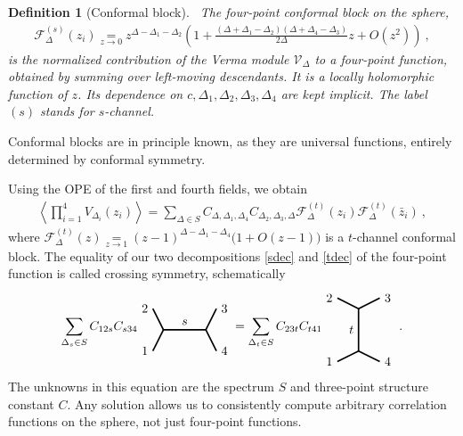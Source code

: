 \documentclass[12pt, a4paper]{article}
\theoremstyle{break}
\newtheorem{defn}[exo]{Definition}
\begin{document}
\begin{defn}[Conformal block]
 ~\label{def:block}
 The four-point conformal block on the sphere,
 \begin{align}
  \mathcal{F}^{(s)}_\Delta(z_i) \underset{z\to 0}{=} z^{\Delta-\Delta_1-\Delta_2}\left( 1 + \frac{(\Delta+\Delta_1-\Delta_2)(\Delta+\Delta_4-\Delta_3)}{2\Delta}z + O(z^2) \right)\ ,
  \label{eq:gsd}
 \end{align}
is the normalized contribution of the Verma module $\mathcal V_\Delta$ to a four-point function, obtained by summing over left-moving descendants. It is a locally holomorphic function of $z$. Its dependence on $c,\Delta_1,\Delta_2,\Delta_3,\Delta_4$ are kept implicit. The label $(s)$ stands for $s$-channel.
\end{defn}
Conformal blocks are in principle known, as they are universal functions, entirely determined by conformal symmetry. 

Using the OPE of the first and fourth fields, we obtain 
\begin{align}
 \left<\prod_{i=1}^4 V_{\Delta_i}(z_i)\right>
 =\sum_{\Delta\in S} C_{\Delta,\Delta_1,\Delta_4} C_{\Delta_2,\Delta_3,\Delta}   \mathcal{F}^{(t)}_\Delta(z_i) \mathcal{F}^{(t)}_\Delta(\bar z_i)\ ,
 \label{tdec}
\end{align}
where $\mathcal{F}^{(t)}_\Delta(z) \underset{z\to 1}{=} (z-1)^{\Delta-\Delta_1-\Delta_4}\Big(1+O(z-1)\Big)$ is a $t$-channel conformal block.
The equality of our two decompositions \eqref{sdec} and \eqref{tdec} of the four-point function is called crossing symmetry, schematically 
\begin{align}
 \sum_{\Delta_s\in S} C_{12s} C_{s34} 
 \begin{tikzpicture}[baseline=(current  bounding  box.center), very thick, scale = .3]
\draw (-1,2) node [left] {$2$} -- (0,0) -- node [above] {$s$} (4,0) -- (5,2) node [right] {$3$};
\draw (-1,-2) node [left] {$1$} -- (0,0);
\draw (4,0) -- (5,-2) node [right] {$4$};
\end{tikzpicture} 
= \sum_{\Delta_t\in S} C_{23t}C_{t41} 
\begin{tikzpicture}[baseline=(current  bounding  box.center), very thick, scale = .3]
 \draw (-2,3) node [left] {$2$} -- (0,2) -- node [left] {$t$} (0,-2) -- (-2, -3) node [left] {$1$};
\draw (0,2) -- (2,3) node [right] {$3$};
\draw (0,-2) -- (2, -3) node [right] {$4$};
\end{tikzpicture}
\ .
\label{csd}
\end{align}
The unknowns in this equation are the spectrum $S$ and three-point structure constant $C$. 
Any solution allows us to consistently compute arbitrary correlation functions on the sphere, not just four-point functions.
\end{document}
